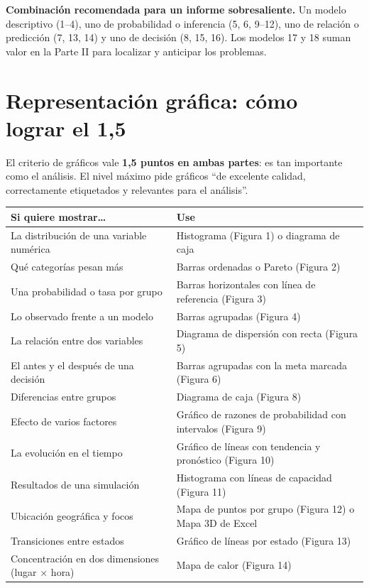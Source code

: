 \begin{cajaExito}
\textbf{Combinación recomendada para un informe sobresaliente.} Un modelo descriptivo
(1--4), uno de probabilidad o inferencia (5, 6, 9--12), uno de relación o predicción (7,
13, 14) y uno de decisión (8, 15, 16). Los modelos 17 y 18 suman valor en la Parte II
para localizar y anticipar los problemas.
\end{cajaExito}

\section{Representación gráfica: cómo lograr el 1,5}

El criterio de gráficos vale \textbf{1,5 puntos en ambas partes}: es tan importante como
el análisis. El nivel máximo pide gráficos ``de excelente calidad, correctamente
etiquetados y relevantes para el análisis''.

\begin{center}
\footnotesize
\begin{tabularx}{\textwidth}{@{}p{5cm}X@{}}
\toprule
\textbf{Si quiere mostrar\ldots} & \textbf{Use}\\
\midrule
La distribución de una variable numérica & Histograma (Figura 1) o diagrama de caja\\
Qué categorías pesan más & Barras ordenadas o Pareto (Figura 2)\\
Una probabilidad o tasa por grupo & Barras horizontales con línea de referencia (Figura 3)\\
Lo observado frente a un modelo & Barras agrupadas (Figura 4)\\
La relación entre dos variables & Diagrama de dispersión con recta (Figura 5)\\
El antes y el después de una decisión & Barras agrupadas con la meta marcada (Figura 6)\\
Diferencias entre grupos & Diagrama de caja (Figura 8)\\
Efecto de varios factores & Gráfico de razones de probabilidad con intervalos (Figura 9)\\
La evolución en el tiempo & Gráfico de líneas con tendencia y pronóstico (Figura 10)\\
Resultados de una simulación & Histograma con líneas de capacidad (Figura 11)\\
Ubicación geográfica y focos & Mapa de puntos por grupo (Figura 12) o Mapa 3D de Excel\\
Transiciones entre estados & Gráfico de líneas por estado (Figura 13)\\
Concentración en dos dimensiones (lugar $\times$ hora) & Mapa de calor (Figura 14)\\
\bottomrule
\end{tabularx}
\end{center}

